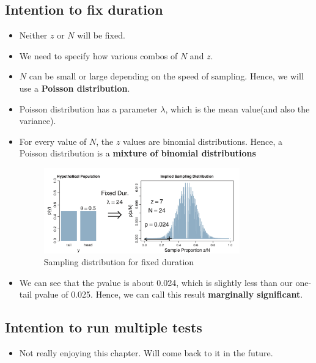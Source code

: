 \documentclass[a4paper]{article}
\begin{document}
\subsection{Intention to fix duration}
\begin{itemize}
    \item Neither $z$ or $N$ will be fixed.
    \item We need to specify how various combos of $N $ and $ z$. 
    \item $N$ can be small or large depending on the speed of sampling. Hence, we will use a \textbf{Poisson distribution}. 
    \item Poisson distribution has a parameter $\lambda$, which is the mean value(and also the variance).
    \item For every value of $N$, the $z$ values are binomial distributions. Hence, a Poisson distribution is a \textbf{mixture of binomial distributions}  
    \begin{figure}[H]
        \centering
        \includegraphics[width=0.8\textwidth]{fixed_duration_sampling}
        \caption{Sampling distribution for fixed duration}
        \label{fig:fixed_duration_sampling}
    \end{figure}
\item We can see that the pvalue is about 0.024, which is slightly less than our one-tail pvalue of 0.025. Hence, we can call this result \textbf{marginally significant}. 
\end{itemize}
\subsection{Intention to run multiple tests}
\begin{itemize}
    \item Not really enjoying this chapter. Will come back to it in the future.
\end{itemize}
\end{document}

